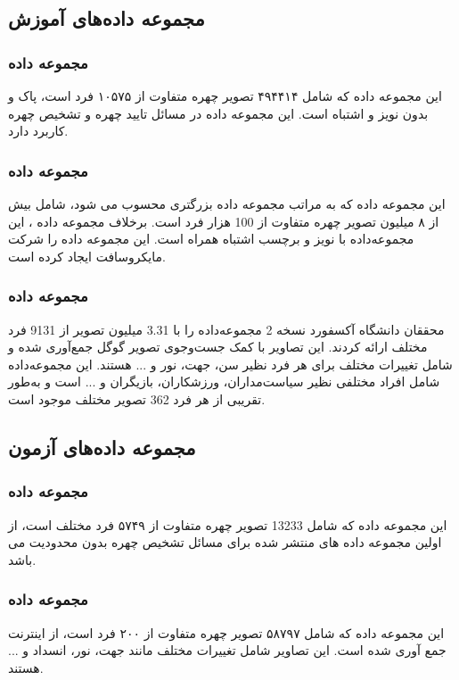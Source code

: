 \subsection{مجموعه داده‌های آموزش}
\subsubsection{مجموعه داده }
این مجموعه داده که شامل ۴۹۴۴۱۴ تصویر چهره متفاوت از ۱۰۵۷۵ فرد است، پاک و بدون نویز و اشتباه است. این مجموعه داده در مسائل تایید چهره و تشخیص چهره کاربرد دارد. \cite{CASIA_dataset}

\subsubsection{مجموعه داده }
این مجموعه داده که به مراتب مجموعه داده بزرگتری محسوب می شود، شامل بیش از ۸ میلیون تصویر چهره متفاوت از 100 هزار فرد است. برخلاف مجموعه داده ، این مجموعه‌داده با نویز و برچسب اشتباه همراه است. این مجموعه داده را شرکت مایکروسافت ایجاد کرده است. \cite{MS_Celeb_dataset}

\subsubsection{مجموعه داده }
محققان دانشگاه آکسفورد نسخه 2 مجموعه‌داده‌  را با 3.31 میلیون تصویر از 9131 فرد مختلف ارائه کردند. این تصاویر با کمک جست‌و‌جوی تصویر گوگل جمع‌آوری ‌شده و شامل تغییرات مختلف برای هر فرد نظیر سن، جهت، نور و ... هستند. این مجموعه‌داده شامل افراد مختلفی نظیر سیاست‌مداران، ورزشکاران، بازیگران و ... است و به‌طور تقریبی از هر فرد 362 تصویر مختلف موجود است. \cite{VGGFace2_dataset}

\subsection{مجموعه داده‌های آزمون}
\subsubsection{مجموعه داده }
این مجموعه داده که شامل 13233 تصویر چهره متفاوت از ۵۷۴۹ فرد مختلف است، از اولین مجموعه داده های منتشر شده برای مسائل تشخیص چهره بدون محدودیت می باشد. \cite{LFW_dataset}

\subsubsection{مجموعه داده }
این مجموعه داده که شامل ۵۸۷۹۷ تصویر چهره متفاوت از ۲۰۰ فرد است، از اینترنت جمع آوری شده است. این تصاویر شامل تغییرات مختلف مانند جهت، نور، انسداد و ... هستند. \cite{PubFig_dataset}

